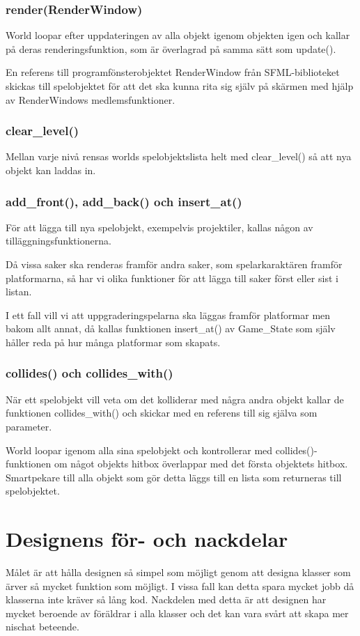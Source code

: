 \documentclass{TDP005mall}
\begin{document}
\subsubsection{render(RenderWindow)}
World loopar efter uppdateringen av alla objekt igenom objekten igen och kallar på deras renderingsfunktion, som är överlagrad på samma sätt som update(). 

En referens till programfönsterobjektet RenderWindow från SFML-biblioteket skickas till spelobjektet för att det ska kunna rita sig själv på skärmen med hjälp av RenderWindows medlemsfunktioner.

\subsubsection{clear\_level()}
Mellan varje nivå rensas worlds spelobjektslista helt med clear\_level() så att nya objekt kan laddas in.

\subsubsection{add\_front(), add\_back() och insert\_at()}
För att lägga till nya spelobjekt, exempelvis projektiler, kallas någon av tilläggningsfunktionerna. 

Då vissa saker ska renderas framför andra saker, som spelarkaraktären framför platformarna, så har vi olika funktioner för att lägga till saker först eller sist i listan.

I ett fall vill vi att uppgraderingspelarna ska läggas framför platformar men bakom allt annat, då kallas funktionen insert\_at() av Game\_State som själv håller reda på hur många platformar som skapats. 

\subsubsection{collides() och collides\_with()}
När ett spelobjekt vill veta om det kolliderar med några andra objekt kallar de funktionen collides\_with() och skickar med en referens till sig själva som parameter. 

World loopar igenom alla sina spelobjekt och kontrollerar med collides()-funktionen om något objekts hitbox överlappar med det första objektets hitbox. Smartpekare till alla objekt som gör detta läggs till en lista som returneras till spelobjektet.

\section{Designens för- och nackdelar}
Målet är att hålla designen så simpel som möjligt genom att designa klasser som ärver så mycket funktion som möjligt. I vissa fall kan detta spara mycket jobb då klasserna inte kräver så lång kod. Nackdelen med detta är att designen har mycket beroende av föräldrar i alla klasser och det kan vara svårt att skapa mer nischat beteende.
\end{document}
